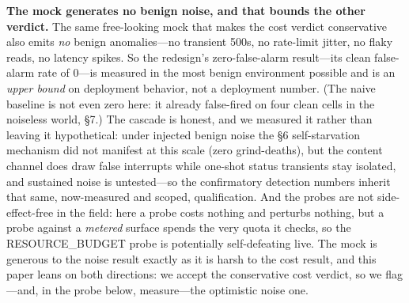 \documentclass[acmsmall,screen]{acmart}
\begin{document}
\textbf{The mock generates no benign noise, and that bounds the other verdict.}
The same free-looking mock that makes the cost verdict conservative also emits
\emph{no} benign anomalies---no transient 500s, no rate-limit jitter, no flaky
reads, no latency spikes. So the redesign's zero-false-alarm result---its clean
false-alarm rate of 0---is measured in the most benign environment possible and is
an \emph{upper bound} on deployment behavior, not a deployment number. (The naive
baseline is not even zero here: it already false-fired on four clean cells in the
noiseless world, \S7.) The cascade is honest, and we measured it rather than leaving it hypothetical:
under injected benign noise the \S6 self-starvation mechanism did not manifest at
this scale (zero grind-deaths), but the content channel does draw false interrupts
while one-shot status transients stay isolated, and sustained noise is untested---so
the confirmatory detection numbers inherit that same, now-measured and scoped,
qualification. And the probes are not side-effect-free in the field:
here a probe costs nothing and perturbs nothing, but a probe against a
\emph{metered} surface spends the very quota it checks, so the RESOURCE\_BUDGET
probe is potentially self-defeating live. The mock is generous to the noise
result exactly as it is harsh to the cost result, and this paper leans on both
directions: we accept the conservative cost verdict, so we flag---and, in the probe below,
measure---the optimistic noise one.
\end{document}
